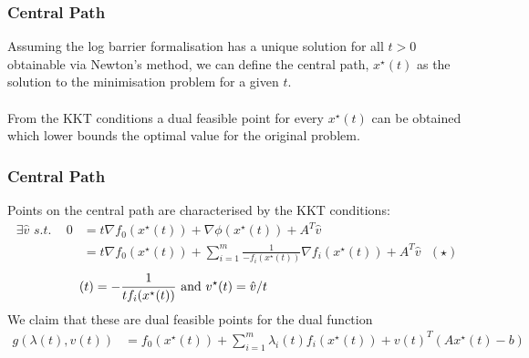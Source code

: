 \documentclass{beamer}
\begin{document}
\begin{frame}
    \frametitle{Central Path}
    Assuming the log barrier formalisation has a unique solution for all
    $t > 0$ obtainable via Newton's method, we can define the central path,
    $x^{\star}(t)$ as the solution to the minimisation problem for a given
    $t$.
    \\~\\
    From the KKT conditions a dual feasible point for every
    $x^{\star}(t)$ can be obtained which lower bounds the optimal value for
    the original problem.
\end{frame}

\begin{frame}
    \frametitle{Central Path}
    Points on the central path are characterised by the KKT conditions:
    {\footnotesize
    \begin{align*}
        \exists \hat{v}\,\, s.t.  \, \, \,\, \, \, \,
        0 &= t\nabla f_{0}(x^{\star}(t)) + \nabla\phi(x^{\star}(t)) +
        A^{T}\hat{v} \\
        &= t \nabla f_{0}(x^{\star}(t)) +
        \sum\limits_{i=1}^{m}\frac{1}{-f_{i}(x^{\star}(t))}\nabla
        f_{i}(x^{\star}(t)) + A^{T}\hat{v} \,\,\,\, (\star)
    \end{align*}}
    {\footnotesize
    \begin{align*}
        \hspace{-50mm}\text{Let }\hspace{5mm}
        \lambda_{i}^{\star}(t) = -\frac{1}{t f_{i}(x^{\star}(t))} \text{ and }
        v^{\star}(t) = \hat{v} / {t}
    \end{align*}}
    We claim that these are dual feasible points for the dual function
    {\footnotesize
        \begin{align*}
            g(\lambda(t), v(t)) &= f_{0}(x^{\star}(t))
            + \sum\limits_{i=1}^{m}\lambda_{i}(t)f_{i}(x^{\star}(t))
            + v(t)^{T}(Ax^{\star}(t) - b) \\
        \end{align*}
    }
\end{frame}
\end{document}
